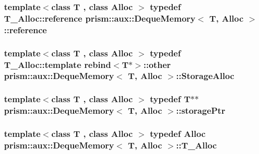 \subsubsection[{\texorpdfstring{reference}{reference}}]{\setlength{\rightskip}{0pt plus 5cm}template$<$class T , class Alloc $>$ typedef T\+\_\+\+Alloc\+::reference {\bf prism\+::aux\+::\+Deque\+Memory}$<$ T, Alloc $>$\+::{\bf reference}}\hypertarget{structprism_1_1aux_1_1_deque_memory_a735c5ea8341a854c7b0a9927c1296985}{}\label{structprism_1_1aux_1_1_deque_memory_a735c5ea8341a854c7b0a9927c1296985}
\subsubsection[{\texorpdfstring{Storage\+Alloc}{StorageAlloc}}]{\setlength{\rightskip}{0pt plus 5cm}template$<$class T , class Alloc $>$ typedef T\+\_\+\+Alloc\+::template rebind$<$T$\ast$$>$\+::other {\bf prism\+::aux\+::\+Deque\+Memory}$<$ T, Alloc $>$\+::{\bf Storage\+Alloc}}\hypertarget{structprism_1_1aux_1_1_deque_memory_ac314b95624792862b1c97ea15e5bffd5}{}\label{structprism_1_1aux_1_1_deque_memory_ac314b95624792862b1c97ea15e5bffd5}
\subsubsection[{\texorpdfstring{storage\+Ptr}{storagePtr}}]{\setlength{\rightskip}{0pt plus 5cm}template$<$class T , class Alloc $>$ typedef T$\ast$$\ast$ {\bf prism\+::aux\+::\+Deque\+Memory}$<$ T, Alloc $>$\+::{\bf storage\+Ptr}}\hypertarget{structprism_1_1aux_1_1_deque_memory_a94284c2277f5fbe4b5d0725467d5a6d3}{}\label{structprism_1_1aux_1_1_deque_memory_a94284c2277f5fbe4b5d0725467d5a6d3}
\subsubsection[{\texorpdfstring{T\+\_\+\+Alloc}{T_Alloc}}]{\setlength{\rightskip}{0pt plus 5cm}template$<$class T , class Alloc $>$ typedef Alloc {\bf prism\+::aux\+::\+Deque\+Memory}$<$ T, Alloc $>$\+::{\bf T\+\_\+\+Alloc}}\hypertarget{structprism_1_1aux_1_1_deque_memory_ae51ea3bab8a3bb39d82eb9032396b980}{}\label{structprism_1_1aux_1_1_deque_memory_ae51ea3bab8a3bb39d82eb9032396b980}
